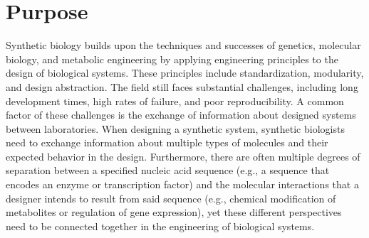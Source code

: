 \section{Purpose}


Synthetic biology builds upon the techniques and successes of genetics, molecular biology, and metabolic engineering by applying engineering principles to the design of biological systems. These principles include standardization, modularity, and design abstraction. The field still faces substantial challenges, including long development times, high rates of failure, and poor reproducibility. A common factor of these challenges is the exchange of information about designed systems between laboratories. 
When designing a synthetic system, synthetic biologists need to exchange information about multiple types of molecules and their expected behavior in the design.
Furthermore, there are often multiple degrees of separation between a specified nucleic acid sequence (e.g., a sequence that encodes an enzyme or transcription factor) and the molecular interactions that a designer intends to result from said sequence (e.g., chemical modification of metabolites or regulation of gene expression), yet these different perspectives need to be connected together in the engineering of biological systems.

